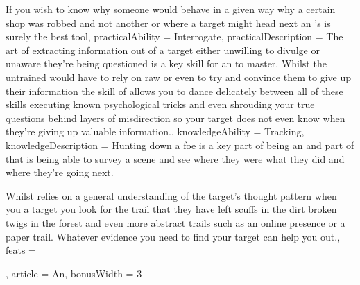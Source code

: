 {If you wish to know why someone would behave in a given way\comma{} why a certain shop was robbed and not another\comma{} or where a target might head next \minus{} an \name{}'s \imp{\innateAbility} is surely the best tool,
	practicalAbility = Interrogate,
	practicalDescription = The art of extracting information out of a target\comma{} either unwilling to divulge or unaware they're being questioned\comma{} is a key skill for an \bname{} to master.   Whilst the untrained would have to rely on raw \comma{} \comma{}  or even  to try and convince them to give up their information\comma{} the skill of  allows you to dance delicately between all of these skills\comma{} executing known psychological tricks and even shrouding your true questions behind layers of misdirection so your target does not even know when they're giving up valuable information.,
	knowledgeAbility = Tracking,
	knowledgeDescription = Hunting down a foe is a key part of being an \bname{}\comma{} and part of that is being able to survey a scene and see where they were\comma{} what they did\comma{} and where they're going next.

Whilst  relies on a general understanding of the target's thought pattern\comma{} when you  a target you look for the trail that they have left \minus{} scuffs in the dirt\comma{} broken twigs in the forest and even more abstract trails such as an online presence or a paper trail. Whatever evidence you need to find your target\comma{}  can help you out.,
	feats = 





,
	article = An,
	bonusWidth = 3
}

